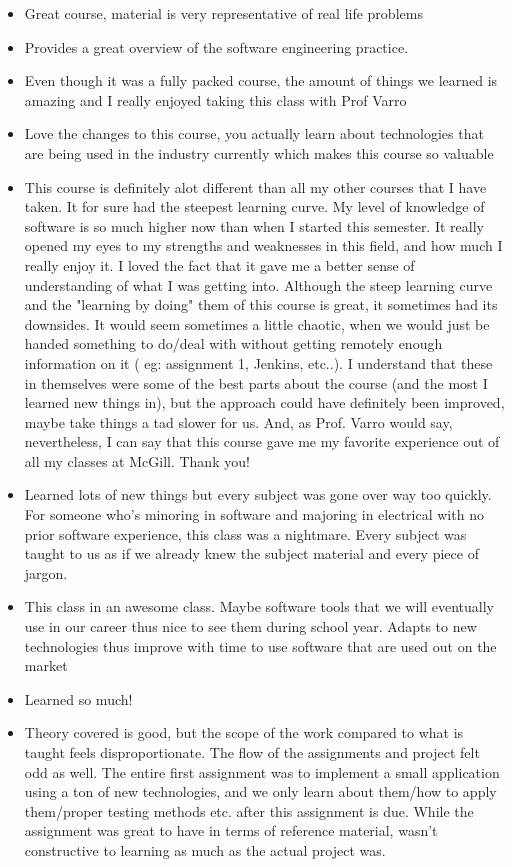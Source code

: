 \begin{itemize}[leftmargin=0.5cm]
\item Great course, material is very representative of real life problems 
\item Provides a great overview of the software engineering practice. 
\item Even though it was a fully packed course, the amount of things we learned is amazing and I really enjoyed taking this class with Prof Varro 
\item Love the changes to this course, you actually learn about technologies that are being used in the industry currently which makes this course so valuable 
\item This course is definitely alot different than all my other courses that I have taken. It for sure had the steepest learning curve. My level of knowledge of software is so much higher now than when I started this semester. It really opened my eyes to my strengths and weaknesses in this field, and how much I really enjoy it. I loved the fact that it gave me a better sense of understanding of what I was getting into. Although the steep learning curve and the "learning by doing" them of this course is great, it sometimes had its downsides. It would seem sometimes a little chaotic, when we would just be handed something to do/deal with without getting remotely enough information on it ( eg: assignment 1, Jenkins, etc..). I understand that these in themselves were some of the best parts about the course (and the most I learned new things in), but the approach could have definitely been improved, maybe take things a tad slower for us. And, as Prof. Varro would say, nevertheless, I can say that this course gave me my favorite experience out of all my classes at McGill. Thank you! 
\item Learned lots of new things but every subject was gone over way too quickly. For someone who's minoring in software and majoring in electrical with no prior software experience, this class was a nightmare. Every subject was taught to us as if we already knew the subject material and every piece of jargon. 
\item This class in an awesome class. Maybe software tools that we will eventually use in our career thus nice to see them during school year. Adapts to new technologies thus improve with time to use software that are used out on the market 
\item Learned so much! 
\item Theory covered is good, but the scope of the work compared to what is taught feels disproportionate. The flow of the assignments and project felt odd as well. The entire first assignment was to implement a small application using a ton of new technologies, and we only learn about them/how to apply them/proper testing methods etc. after this assignment is due. While the assignment was great to have in terms of reference material, wasn't constructive to learning as much as the actual project was. 

\end{itemize}
